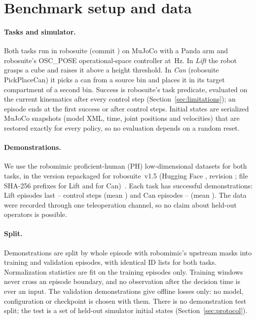 \section{Benchmark setup and data}
\label{sec:setup}

\paragraph{Tasks and simulator.} Both tasks run in robosuite  (commit
) on MuJoCo  with a Panda arm and robosuite's
OSC\_POSE operational-space controller at \,Hz. In \emph{Lift} the robot grasps a
cube and raises it above a height threshold. In \emph{Can} (robosuite PickPlaceCan) it picks
a can from a source bin and places it in its target compartment of a second bin. Success is
robosuite's task predicate, evaluated on the current kinematics after every control step
(Section~\ref{sec:limitations}); an episode ends
at the first success or after  control steps. Initial states are
serialized MuJoCo snapshots (model XML, time, joint positions and velocities) that are
restored exactly for every policy, so no evaluation depends on a random reset.

\paragraph{Demonstrations.} We use the robomimic proficient-human (PH) low-dimensional
datasets for both tasks, in the version repackaged for robosuite~v1.5
(Hugging Face , revision ; file
SHA-256 prefixes  for Lift and  for
Can)~\citep{mandlekar2021robomimic}. Each task has  successful
demonstrations: Lift episodes last -- control
steps (mean ) and Can episodes
-- (mean ). The data were
recorded through one teleoperation channel, so no claim about held-out operators is
possible.

\paragraph{Split.} Demonstrations are split by whole episode with robomimic's upstream
masks into  training and  validation episodes, with
identical ID lists for both tasks. Normalization statistics are fit on the training episodes
only. Training windows never cross an episode boundary, and no observation after the
decision time is ever an input. The validation demonstrations give offline losses only: no
model, configuration or checkpoint is chosen with them. There is no demonstration test
split; the test is a set of held-out simulator initial states (Section~\ref{sec:protocol}).

